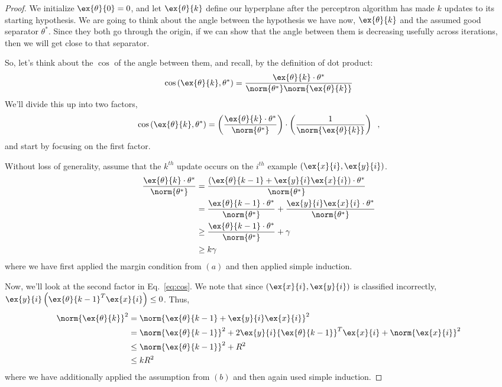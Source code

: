 \begin{proof}
  We initialize $\ex{\theta}{0} = 0$, and let $\ex{\theta}{k}$ define our
  hyperplane after the perceptron algorithm has made $k$ updates to its
  starting hypothesis.
  We are going to think about the angle between the hypothesis we have
  now, $\ex{\theta}{k}$ and the assumed good separator $\theta^*$.
  Since they both go through the origin, if we can show that the angle
  between them is decreasing usefully across iterations, then we will
  get close to that separator.

  So, let's think about the $\cos$ of the angle between them, and
  recall, by the definition of dot product:
  \[\cos\left(\ex{\theta}{k}, \theta^*\right)
    = \frac{\ex{\theta}{k} \cdot \theta^*}{
      \norm{\theta^*}\norm{\ex{\theta}{k}}}\]
  We'll divide this up into two factors,
  \begin{equation}
    \cos\left(\ex{\theta}{k}, \theta^*\right)
    = \left(\frac{\ex{\theta}{k} \cdot
      \theta^*}{\norm{\theta^*}}\right)\cdot
    \left(\frac{1}{\norm{\ex{\theta}{k}}}\right)\;\;,
    \label{eq:cos}
  \end{equation}
  and start by focusing on the first factor.

  Without loss of generality, assume that the $k^{th}$
  update occurs on the $i^{th}$ example $\left(\ex{x}{i}, \ex{y}{i}\right)$.
  \begin{align*}
    \frac{\ex{\theta}{k} \cdot \theta^*}{\norm{\theta^*}}
     & = \frac{\left(\ex{\theta}{k-1} + \ex{y}{i}\ex{x}{i}\right)\cdot \theta^*}
    {\norm{\theta^*}}                                                            \\
     & = \frac{\ex{\theta}{k-1}\cdot \theta^*}{\norm{\theta^*}} + \frac{
    \ex{y}{i}\ex{x}{i}\cdot\theta^*}{\norm{\theta^*}}                            \\
     & \geq \frac{\ex{\theta}{k-1}\cdot \theta^*}{\norm{\theta^*}} + \gamma      \\
     & \geq k\gamma
  \end{align*}
  where we have first applied the margin condition from $(a)$ and then
  applied simple induction.

  Now, we'll look at the second factor in Eq.~\ref{eq:cos}.
  We note that since $\left(\ex{x}{i},\ex{y}{i}\right)$ is classified
  incorrectly, $\ex{y}{i}\left({\ex{\theta}{k-1}}^T\ex{x}{i}\right) \leq 0$.
  Thus,
  \begin{align*}
    \norm{\ex{\theta}{k}}^2 & = \norm{\ex{\theta}{k-1} + \ex{y}{i}\ex{x}{i}}^2 \\
                            & = \norm{\ex{\theta}{k-1}}^2 + 2\ex{y}{i}
    {\ex{\theta}{k-1}}^T\ex{x}{i} + \norm{\ex{x}{i}}^2                         \\
                            & \leq \norm{\ex{\theta}{k-1}}^2 + R^2             \\
                            & \leq kR^2
  \end{align*}
  where we have additionally applied the assumption from $(b)$ and then
  again used simple induction.


\end{proof}
